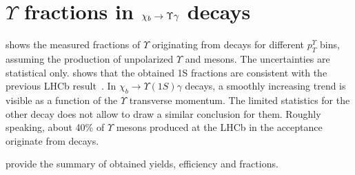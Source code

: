 \section[\texorpdfstring{$\Upsilon$ fractions}{Y fractions}]{\texorpdfstring{$\Upsilon$}{Y} fractions in \texorpdfstring{$\chi_{b} \rightarrow \Upsilon \gamma$}{chib --> Y gamma} decays}
\label{sec:fraction}

 shows the measured fractions of $\Upsilon$  originating
from \chib decays for different $p_T^{\Upsilon}$ bins,  assuming the production
of unpolarized $\Upsilon$ and \chib mesons. The uncertainties are statistical
only.  shows that the obtained \Y1S fractions are
consistent with the previous LHCb result~\cite{LHCb-PAPER-2012-015}. In $\chi_b
\rightarrow \Upsilon(1S) \gamma$ decays, a smoothly increasing trend is visible
as a function of the $\Upsilon$ transverse momentum. The limited statistics for
the other decay does not allow to draw a similar conclusion for them. Roughly
speaking, about 40\% of $\Upsilon$ mesons produced at the LHCb in the \lhcb
acceptance originate from \chib decays.





 provide the summary
of obtained yields, efficiency and fractions.


